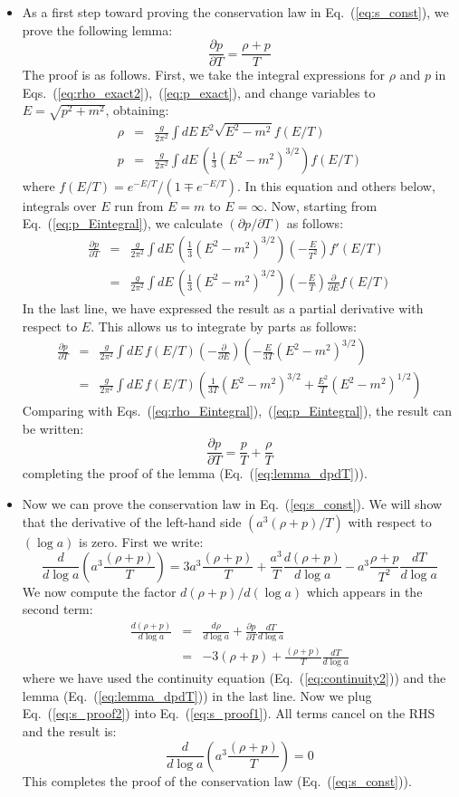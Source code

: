 \documentclass[aps,prd,superscriptaddress,groupedaddress,nofootinbib,nobibnotes]{revtex4}
\newcommand{\be}{\begin{equation}}
\newcommand{\ee}{\end{equation}}
\newcommand{\ba}{\begin{eqnarray}}
\newcommand{\ea}{\end{eqnarray}}
\newcommand{\nn}{\nonumber}
\begin{document}
\begin{itemize}
\item
As a first step toward proving the conservation law in Eq.~(\ref{eq:s_const}), we prove the following lemma:
\be
\frac{\partial p}{\partial T} = \frac{\rho + p}{T}  \label{eq:lemma_dpdT}
\ee
The proof is as follows.  First, we take the integral expressions for $\rho$ and $p$ in Eqs.~(\ref{eq:rho_exact2}),~(\ref{eq:p_exact}),
and change variables to $E = \sqrt{p^2+m^2}$, obtaining:
\ba
\rho &=& \frac{g}{2\pi^2} \int dE \, E^2 \sqrt{E^2-m^2} f(E/T)  \label{eq:rho_Eintegral} \\
p &=& \frac{g}{2\pi^2} \int dE \, \left( \frac{1}{3} (E^2-m^2)^{3/2} \right) f(E/T)  \label{eq:p_Eintegral}
\ea
where $f(E/T) = e^{-E/T} / (1 \mp e^{-E/T})$.
In this equation and others below, integrals over $E$ run from $E=m$ to $E=\infty$.
Now, starting from Eq.~(\ref{eq:p_Eintegral}), we calculate $(\partial p/\partial T)$ as follows:
\ba
\frac{\partial p}{\partial T}
 &=& \frac{g}{2\pi^2} \int dE \, \left( \frac{1}{3} (E^2-m^2)^{3/2} \right) \left( - \frac{E}{T^2} \right) f'(E/T) \nn \\
 &=& \frac{g}{2\pi^2} \int dE \, \left( \frac{1}{3} (E^2-m^2)^{3/2} \right) \left( - \frac{E}{T} \right) \frac{\partial}{\partial E} f(E/T) 
\ea
In the last line, we have expressed the result as a partial derivative with respect to $E$.
This allows us to integrate by parts as follows:
\ba
\frac{\partial p}{\partial T}
  &=& \frac{g}{2\pi^2} \int dE \, f(E/T) \left( -\frac{\partial}{\partial E} \right)
         \left( -\frac{E}{3T} (E^2-m^2)^{3/2} \right) \nn \\
  &=& \frac{g}{2\pi^2} \int dE \, f(E/T) \left( \frac{1}{3T} (E^2-m^2)^{3/2} + \frac{E^2}{T} (E^2-m^2)^{1/2} \right)
\ea
Comparing with Eqs.~(\ref{eq:rho_Eintegral}),~(\ref{eq:p_Eintegral}), the result can be written:
\be
\frac{\partial p}{\partial T} = \frac{p}{T} + \frac{\rho}{T}
\ee
completing the proof of the lemma (Eq.~(\ref{eq:lemma_dpdT})).

\item
Now we can prove the conservation law in Eq.~(\ref{eq:s_const}).
We will show that the derivative of the left-hand side $(a^3(\rho+p)/T)$ with respect to $(\log a)$ is zero.
First we write:
\be
\frac{d}{d\log a}\left( a^3 \frac{(\rho + p)}{T} \right)
  = 3 a^3 \frac{(\rho + p)}{T} + \frac{a^3}{T} \frac{d(\rho+p)}{d\log a} - a^3 \frac{\rho+p}{T^2} \frac{dT}{d\log a} \label{eq:s_proof1}
\ee
We now compute the factor $d(\rho+p)/d(\log a)$ which appears in the second term:
\ba
\frac{d(\rho + p)}{d\log a} 
  &=& \frac{d\rho}{d\log a} + \frac{\partial p}{\partial T} \frac{dT}{d\log a} \nn \\
  &=& -3(\rho + p) + \frac{(\rho + p)}{T} \frac{dT}{d\log a}  \label{eq:s_proof2}
\ea
where we have used the continuity equation (Eq.~(\ref{eq:continuity2})) and the lemma (Eq.~(\ref{eq:lemma_dpdT}))
in the last line.  Now we plug Eq.~(\ref{eq:s_proof2}) into Eq.~(\ref{eq:s_proof1}).  All terms cancel on the RHS
and the result is:
\be
\frac{d}{d\log a}\left( a^3 \frac{(\rho + p)}{T} \right) = 0
\ee
This completes the proof of the conservation law (Eq.~(\ref{eq:s_const})).


\end{itemize}
\end{document}
